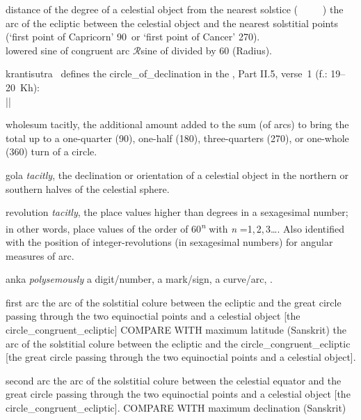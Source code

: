 distance of the degree of a celestial object from the nearest solstice
  (\textit{\bud\idafaconsonant\ \daraji\idafavowel\ \kawkab\ \az\ \inqilab\idafaconsonant\ \aqrab})
the arc of the ecliptic between the celestial object and the nearest solstitial points (`first point of Capricorn' 90\degree\ or `first point of Cancer' 270\degree).\\[5pt]

lowered sine of congruent arc
$\mathcal{R}$\thinspace sine of \protect{} divided by 60 (Radius).

krantisutra
\Nityananda\ defines the \gls{circle_of_declination} in the \Siddhantasindhu, Part II.5, verse~1 (f.: 19--20~Kh):\\[5pt]
          ||

wholesum
tacitly, the additional amount added to the sum (of arcs) to bring the total up to a one-quarter (90\degree), one-half (180\degree), three-quarters (270\degree), or one-whole (360\degree) turn of a circle.

gola
\textit{tacitly}, the declination or orientation of a celestial object in the northern or southern halves of the celestial sphere.

revolution
\textit{tacitly}, the place values higher than degrees in a sexagesimal number; in other words, 
        place values of the order of 60\textsuperscript{\textit{n}} with \textit{n} =1,\,2,\,3\dots. Also identified with the position of integer-revolutions (in sexagesimal numbers) for angular measures of arc.
        
anka
 \textit{polysemously} a digit/number, a mark/sign, a curve/arc, \etcp.

first arc
the arc of the solstitial colure between the ecliptic and the great circle passing through the two equinoctial points and a celestial object [\ie the \protect\gls{circle_congruent_ecliptic}]
COMPARE WITH maximum latitude (Sanskrit)
the arc of the solstitial colure between the ecliptic and the \protect\gls{circle_congruent_ecliptic} [\ie the great circle passing through the two equinoctial points and a celestial object].


second arc
the arc of the solstitial colure between the celestial equator and the great circle passing through the two equinoctial points and a celestial object [\ie the \protect\gls{circle_congruent_ecliptic}]. 
COMPARE WITH maximum declination (Sanskrit)      
        
